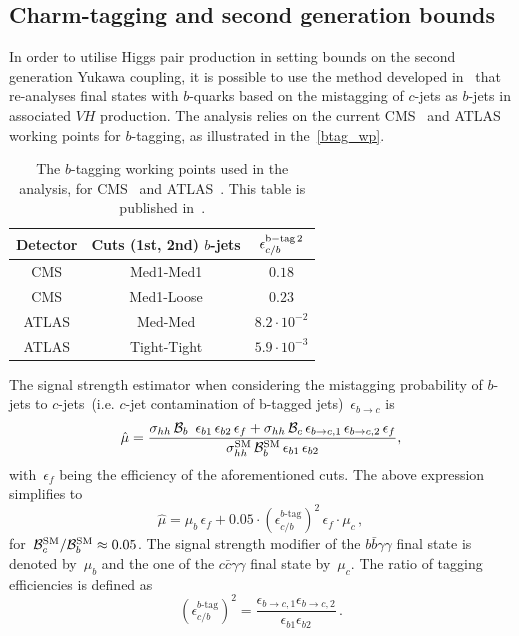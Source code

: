 \subsection{Charm-tagging and second generation bounds}
  In order to utilise Higgs pair production in setting bounds on the second generation Yukawa coupling, it is possible to use the method developed in~\cite{Perez:2015aoa,Kim:2015oua} that re-analyses final states with $b$-quarks based on the mistagging of $c$-jets as $b$-jets in associated $VH$ production. The analysis relies on the current CMS~\cite{Chatrchyan:2013zna} and ATLAS~\cite{Aad:2014xzb} working points for $b$-tagging, as illustrated in the~\autoref{btag_wp}.
\begin{table}
	\centering
	\begin{tabular}{ccc}
		\toprule
		Detector	& Cuts (1st, 2nd) $b$-jets	& $\epsilon_{c/b}^{\rm{b-tag}\,2}$  \\
		\midrule
		CMS    & Med1-Med1   & $0.18$               \\
		CMS    & Med1-Loose  & $0.23$                \\
		\hline
		ATLAS  & Med-Med     & $8.2 \cdot 10^{-2}$ \\
		ATLAS  & Tight-Tight & $5.9 \cdot 10^{-3}$ \\
		\bottomrule
	\end{tabular}
	\caption{The $b$-tagging working points used in the analysis, for CMS~\cite{Chatrchyan:2013zna} and ATLAS~\cite{Aad:2014xzb}. This table is published in~\cite{Alasfar:2019pmn}. }
	\label{btag_wp}
\end{table}
The signal strength estimator when considering the mistagging probability  of $b$-jets to $c$-jets~(i.e. $c$-jet contamination of b-tagged jets)~$\epsilon_{b\to c}$ is
\begin{equation}
	\hat \mu = \frac{\sigma_{hh}\, \mathcal B_b\ \,\epsilon_{b1}\,\epsilon_{b2} \,\epsilon_f+\sigma_{hh}\, \mathcal B_c \,\epsilon_{b\to c,1} \,\epsilon_{b\to c,2}\,\epsilon_f }{\sigma_{hh}^{\mathrm{SM}}\, \mathcal B_b^{\mathrm{SM}}\,  \epsilon_{b1}\,\epsilon_{b2}},
\end{equation}
with~$\epsilon_f$ being the efficiency of the  aforementioned cuts. The above expression simplifies to
\begin{equation}
	\hat \mu = \mu_b\,\epsilon_f +0.05\cdot \left(\epsilon_{c/b}^{\text{$b$-tag}}\right)^2 \, \epsilon_f \cdot  \mu_c\,,
	\label{cmistag}
\end{equation}
for~$ \mathcal B_c^{\mathrm{SM}} / \mathcal B_b^{\mathrm{SM}} \approx 0.05$. The signal strength modifier of the $b\bar{b}\gamma\gamma$ final state is denoted by~$\mu_b$ and the one of the  $c\bar{c}\gamma\gamma$ final state by~$\mu_c$. 
The ratio of tagging efficiencies is defined as
\begin{equation}
	\left( \epsilon_{c/b}^{\text{$b$-tag}}\right)^2 = \frac{\epsilon_{b\to c,1}  \epsilon_{b\to c,2} }{\epsilon_{b1} \epsilon_{b2}}\,.
\end{equation}

